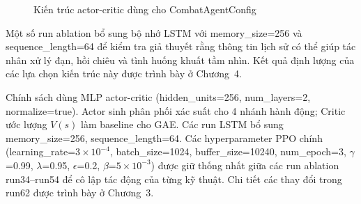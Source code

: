 \begin{figure}[H]
    \centering
    \caption{Kiến trúc actor-critic dùng cho CombatAgentConfig}
    \label{fig:actor_critic_architecture}
\end{figure}

Một số run ablation bổ sung bộ nhớ LSTM với memory\_size=256 và sequence\_length=64 để kiểm tra giả thuyết rằng thông tin lịch sử có thể giúp tác nhân xử lý đạn, hồi chiêu và tình huống khuất tầm nhìn. Kết quả định lượng của các lựa chọn kiến trúc này được trình bày ở Chương~4.

Chính sách dùng MLP actor-critic (hidden\_units=256, num\_layers=2, normalize=true). Actor sinh phân phối xác suất cho 4 nhánh hành động; Critic ước lượng $V(s)$ làm baseline cho GAE. Các run LSTM bổ sung memory\_size=256, sequence\_length=64. Các hyperparameter PPO chính (learning\_rate=$3\times10^{-4}$, batch\_size=1024, buffer\_size=10240, num\_epoch=3, $\gamma$=0.99, $\lambda$=0.95, $\epsilon$=0.2, $\beta$=$5\times10^{-3}$) được giữ thống nhất giữa các run ablation run34--run54 để cô lập tác động của từng kỹ thuật. Chi tiết các thay đổi trong run62 được trình bày ở Chương~3.

